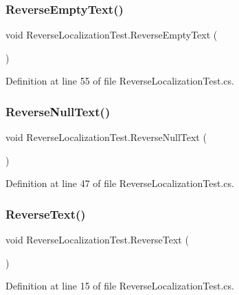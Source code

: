 \subsubsection{\texorpdfstring{Reverse\+Empty\+Text()}{ReverseEmptyText()}}
{\footnotesize\ttfamily void Reverse\+Localization\+Test.\+Reverse\+Empty\+Text (\begin{DoxyParamCaption}{ }\end{DoxyParamCaption})}



Definition at line 55 of file Reverse\+Localization\+Test.\+cs.

\mbox{\label{class_reverse_localization_test_acdd1b4037c2b93f9a1d33c68c67fe77a}} 
\subsubsection{\texorpdfstring{Reverse\+Null\+Text()}{ReverseNullText()}}
{\footnotesize\ttfamily void Reverse\+Localization\+Test.\+Reverse\+Null\+Text (\begin{DoxyParamCaption}{ }\end{DoxyParamCaption})}



Definition at line 47 of file Reverse\+Localization\+Test.\+cs.

\mbox{\label{class_reverse_localization_test_aa1ff1ca94246373ac8be7bae8a5c00d0}} 
\subsubsection{\texorpdfstring{Reverse\+Text()}{ReverseText()}}
{\footnotesize\ttfamily void Reverse\+Localization\+Test.\+Reverse\+Text (\begin{DoxyParamCaption}{ }\end{DoxyParamCaption})}



Definition at line 15 of file Reverse\+Localization\+Test.\+cs.

